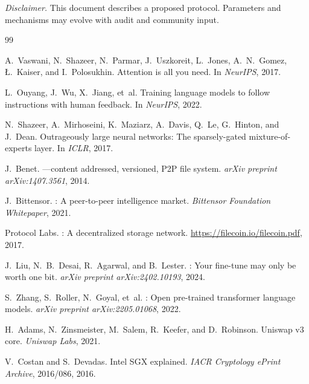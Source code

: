 \documentclass[11pt]{article}
\begin{document}
\vspace{1em}
\noindent\textit{Disclaimer.} This document describes a proposed protocol. Parameters and mechanisms may evolve with audit and community input.

\begin{thebibliography}{99}

A.~Vaswani, N.~Shazeer, N.~Parmar, J.~Uszkoreit, L.~Jones, A.~N.~Gomez,
\L.~Kaiser, and I.~Polosukhin.
\newblock Attention is all you need.
\newblock In \emph{NeurIPS}, 2017.

L.~Ouyang, J.~Wu, X.~Jiang, et~al.
\newblock Training language models to follow instructions with human feedback.
\newblock In \emph{NeurIPS}, 2022.

N.~Shazeer, A.~Mirhoseini, K.~Maziarz, A.~Davis, Q.~Le, G.~Hinton, and
J.~Dean.
\newblock Outrageously large neural networks: The sparsely-gated
mixture-of-experts layer.
\newblock In \emph{ICLR}, 2017.

J.~Benet.
---content addressed, versioned, {P2P} file system.
\newblock \emph{arXiv preprint arXiv:1407.3561}, 2014.

J.~Bittensor.
: A peer-to-peer intelligence market.
\newblock \emph{Bittensor Foundation Whitepaper}, 2021.

{Protocol Labs}.
: A decentralized storage network.
\newblock \url{https://filecoin.io/filecoin.pdf}, 2017.

J.~Liu, N.~B.~Desai, R.~Agarwal, and B.~Lester.
: Your fine-tune may only be worth one bit.
\newblock \emph{arXiv preprint arXiv:2402.10193}, 2024.

S.~Zhang, S.~Roller, N.~Goyal, et~al.
: Open pre-trained transformer language models.
\newblock \emph{arXiv preprint arXiv:2205.01068}, 2022.

H.~Adams, N.~Zinsmeister, M.~Salem, R.~Keefer, and D.~Robinson.
\newblock Uniswap v3 core.
\newblock \emph{Uniswap Labs}, 2021.

V.~Costan and S.~Devadas.
\newblock Intel {SGX} explained.
\newblock \emph{IACR Cryptology ePrint Archive}, 2016/086, 2016.

\end{thebibliography}
\end{document}

